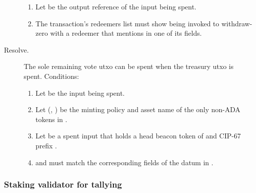 \documentclass[../hydrozoa.tex]{subfiles}
\begin{document}
\begin{description}
\begin{enumerate}
      \item Let  be the output reference of the input being spent.
      \item The transaction's redeemers list must show  being invoked to withdraw-zero with a redeemer that mentions  in one of its fields.
    \end{enumerate}
  \item[Resolve.] The sole remaining vote utxo can be spent when the treasury utxo is spent.
    Conditions:
    \begin{enumerate}
      \item Let  be the input being spent.
      \item Let (, ) be the minting policy and asset name of the only non-ADA tokens in .
      \item Let  be a spent input that holds a head beacon token of  and CIP-67 prefix .
      \item {} and  must match the corresponding fields of the  datum in .
\end{enumerate}
\end{description}

\subsubsection{Staking validator for tallying}
\end{document}
